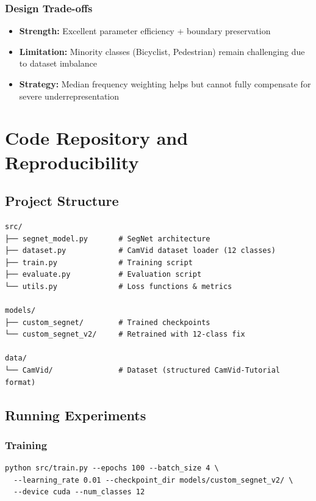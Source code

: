 \documentclass[11pt,a4paper]{report}
\begin{document}
\subsection*{Design Trade-offs}
\begin{itemize}
  \item \textbf{Strength:} Excellent parameter efficiency + boundary preservation
  \item \textbf{Limitation:} Minority classes (Bicyclist, Pedestrian) remain challenging due to dataset imbalance
  \item \textbf{Strategy:} Median frequency weighting helps but cannot fully compensate for severe underrepresentation
\end{itemize}

\chapter{Code Repository and Reproducibility}

\section{Project Structure}

\begin{verbatim}
src/
├── segnet_model.py       # SegNet architecture
├── dataset.py            # CamVid dataset loader (12 classes)
├── train.py              # Training script
├── evaluate.py           # Evaluation script
└── utils.py              # Loss functions & metrics

models/
├── custom_segnet/        # Trained checkpoints
└── custom_segnet_v2/     # Retrained with 12-class fix

data/
└── CamVid/               # Dataset (structured CamVid-Tutorial format)
\end{verbatim}

\section{Running Experiments}

\subsection*{Training}
\begin{verbatim}
python src/train.py --epochs 100 --batch_size 4 \
  --learning_rate 0.01 --checkpoint_dir models/custom_segnet_v2/ \
  --device cuda --num_classes 12
\end{verbatim}
\end{document}
